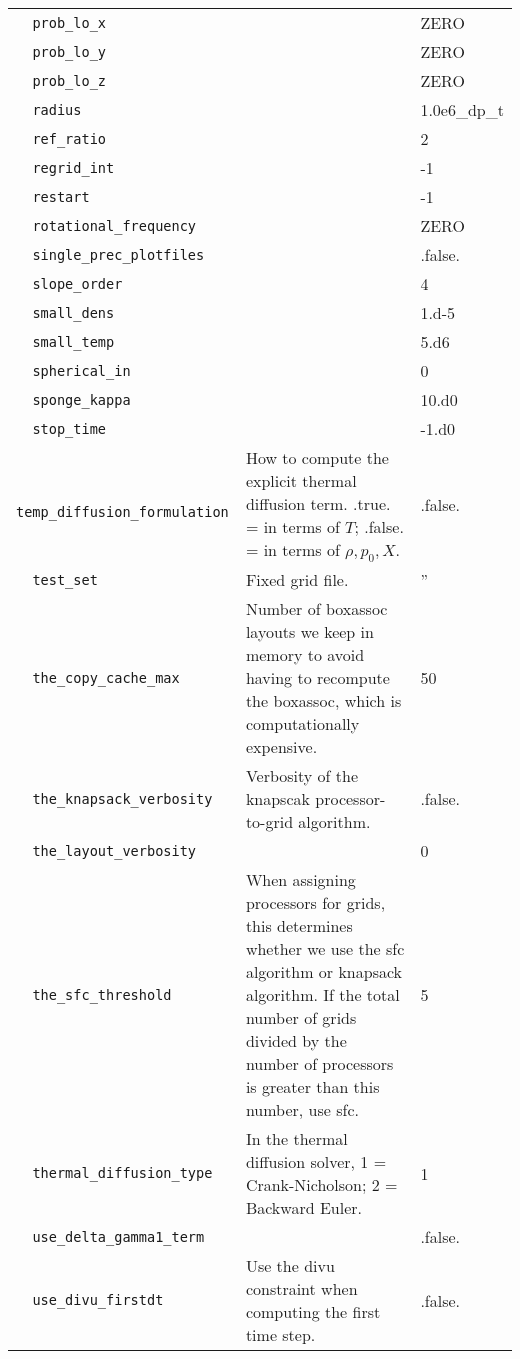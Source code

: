 {\begin{center}
\begin{longtable}{|l|p{3.25in}|l|}
\verb=  prob_lo_x  = &    &  ZERO \\
\verb=  prob_lo_y  = &    &  ZERO \\
\verb=  prob_lo_z  = &    &  ZERO \\
\verb=  radius  = &    &  1.0e6\_dp\_t \\
\verb=  ref_ratio  = &    &  2 \\
\verb=  regrid_int  = &    &  -1 \\
\verb=  restart  = &    &  -1 \\
\verb=  rotational_frequency  = &    &  ZERO \\
\verb=  single_prec_plotfiles  = &    &  .false. \\
\verb=  slope_order  = &    &  4 \\
\verb=  small_dens  = &    &  1.d-5 \\
\verb=  small_temp  = &    &  5.d6 \\
\verb=  spherical_in  = &    &  0 \\
\verb=  sponge_kappa  = &    &  10.d0 \\
\verb=  stop_time  = &    &  -1.d0 \\
\verb=  temp_diffusion_formulation  = &   How to compute the explicit thermal diffusion term. .true. = in terms of $T$; .false. = in terms of $\rho,p_0,X$.  &  .false. \\
\verb=  test_set  = &   Fixed grid file.  &  '' \\
\verb=  the_copy_cache_max  = &    Number of boxassoc layouts we keep in memory to avoid having to recompute the boxassoc, which is computationally expensive.  &  50 \\
\verb=  the_knapsack_verbosity  = &   Verbosity of the knapscak processor-to-grid algorithm.  &  .false. \\
\verb=  the_layout_verbosity  = &    &  0 \\
\verb=  the_sfc_threshold  = &   When assigning processors for grids, this determines whether we use the sfc algorithm or knapsack algorithm.  If the total number of grids divided by the number of processors is greater than this number, use sfc.  &  5 \\
\verb=  thermal_diffusion_type  = &   In the thermal diffusion solver, 1 = Crank-Nicholson; 2 = Backward Euler.  &  1 \\
\verb=  use_delta_gamma1_term  = &    &  .false. \\
\verb=  use_divu_firstdt  = &   Use the divu constraint when computing the first time step.  &  .false. \\

\end{longtable}
\end{center}}
